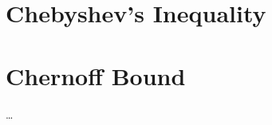 \documentclass[twoside]{article}
\def\beginrefs{\begin{list}%
        {[\arabic{equation}]}{\usecounter{equation}
         \setlength{\leftmargin}{2.0truecm}\setlength{\labelsep}{0.4truecm}%
         \setlength{\labelwidth}{1.6truecm}}}
\def\endrefs{\end{list}}
\def\bibentry#1{\item[\hbox{[#1]}]}
\begin{document}

\section{Chebyshev's Inequality}


\section{Chernoff Bound}

\ldots

\end{document}
